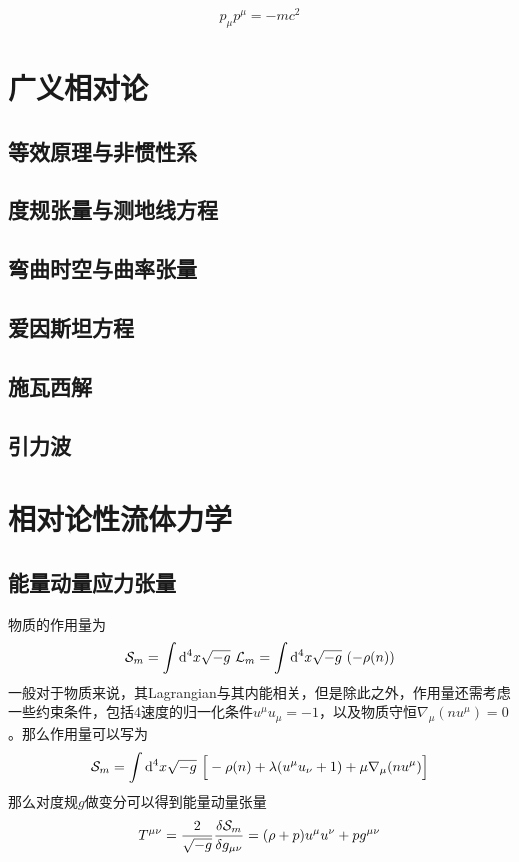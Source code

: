 \documentclass[a4paper]{report}
\begin{document}
\begin{equation}
    p_\mu p^\mu = -m c^2
\end{equation}



\chapter{广义相对论}
\section{等效原理与非惯性系}
\section{度规张量与测地线方程}
\section{弯曲时空与曲率张量}
\section{爱因斯坦方程}
\section{施瓦西解}
\section{引力波}

\chapter{相对论性流体力学}
\section{能量动量应力张量} 
物质的作用量为
\begin{equation}
    \mathcal{S}_m = \int \mathrm{d}^4 x\sqrt{-g}~\mathcal{L}_m = \int \mathrm{d}^4 x\sqrt{-g}~(-\rho(n))
\end{equation}
一般对于物质来说，其Lagrangian与其内能相关，但是除此之外，作用量还需考虑一些约束条件，包括4速度的归一化条件$u^\mu u_\mu = -1$，以及物质守恒$\nabla_\mu(n u^\mu)=0$。那么作用量可以写为
\begin{equation}
    \mathcal{S}_m =  \int \mathrm{d}^4 x\sqrt{-g}~\Big[-\rho(n) +\lambda(u^\mu u_\nu +1) + \mu \nabla_\mu(n u^\mu) \Big]
\end{equation}
那么对度规$g$做变分可以得到能量动量张量
\begin{equation}
    T^{\mu\nu} = \frac{2}{\sqrt{-g}}\frac{\delta \mathcal{S}_m}{\delta g_{\mu\nu}} = (\rho + p)u^\mu u^\nu +p g^{\mu\nu}
\end{equation}
\end{document}
